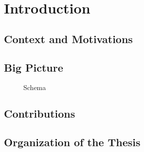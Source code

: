 \chapter{Introduction}
\section{Context and Motivations}
\section{Big Picture}
\begin{figure}
    
    \caption{Schema}
\end{figure}

\section{Contributions}
\section{Organization of the Thesis}